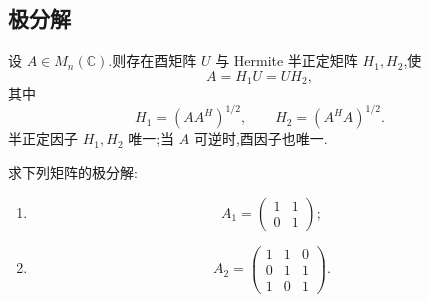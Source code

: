 \subsection{极分解}

\begin{theorem}[\markstar]
设 $A\in M_n(\mathbb{C})$.则存在酉矩阵 $U$ 与 Hermite 半正定矩阵
$H_1,H_2$,使
\[
A=H_1U=UH_2,
\]
其中
\[
H_1=(AA^H)^{1/2},
\qquad
H_2=(A^HA)^{1/2}.
\]
半正定因子 $H_1,H_2$ 唯一;当 $A$ 可逆时,酉因子也唯一.
\end{theorem}


\begin{example}
求下列矩阵的极分解:
\begin{enumerate}
    \item
    \[
    A_1=
    \begin{pmatrix}
    1&1\\
    0&1
    \end{pmatrix};
    \]
    \item
    \[
    A_2=
    \begin{pmatrix}
    1&1&0\\
    0&1&1\\
    1&0&1
    \end{pmatrix}.
    \]
\end{enumerate}
\end{example}
\exampleblank

